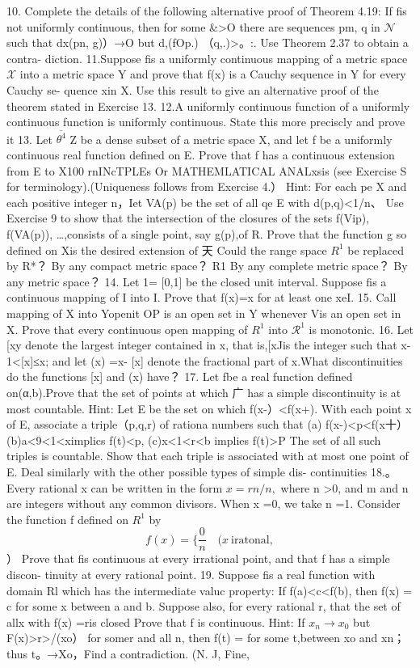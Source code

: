 10. Complete the details of the following alternative proof of Theorem 4.19: If fis not uniformly continuous, then for some &>O there are sequences {pm}, {q} in ${\mathcal{N}}$ such that dx(pn, g)）→O but d,(fOp.) （q,.)>。:. Use Theorem 2.37 to obtain a contra- diction. 11.Suppose fis a uniformly continuous mapping of a metric space ${\mathcal{X}}$ into a metric space Y and prove that {f(x)} is a Cauchy sequence in Y for every Cauchy se- quence {x}in X. Use this result to give an alternative proof of the theorem stated in Exercise 13. 12.A uniformly continuous function of a uniformly continuous function is uniformly continuous. State this more preciscly and prove it 13. Let $\overline{{\theta^{4}}}$ Z be a dense subset of a metric space X, and let f be a uniformly continuous real function defined on E. Prove that f has a continuous extension from E to X100 rnINcTPLEs Or MATHEMLATICAL ANALxsis (see Exercise S for terminology).(Uniqueness follows from Exercise 4.） Hint: For each pe X and each positive integer n，Iet VA(p) be the set of all qe E with d(p,q)<1/n、 Use Exercise 9 to show that the intersection of the closures of the sets f(Vip), f(VA(p)), …,consists of a single point, say g(p),of R. Prove that the function g so defined on Xis the desired extension of 天 Could the range space $\textstyle R^{1}$ be replaced by R*？ By any compact metric space？ R1 By any complete metric space？ By any metric space？ 14. Let 1= [0,1] be the closed unit interval. Suppose fis a continuous mapping of I into I. Prove that f(x)=x for at least one xeI. 15. Call mapping of X into Yopenit OP is an open set in Y whenever Vis an open set in X. Prove that every continuous open mapping of $\textstyle R^{1}$ into $\textstyle{\mathcal{R}}^{1}$ is monotonic. 16. Let [xy denote the largest integer contained in x, that is,[xJis the integer such that x-1<[x]≤x; and let (x) =x- [x] denote the fractional part of x.What discontinuities do the functions [x] and (x) have？ 17. Let fbe a real function defined on(α,b).Prove that the set of points at which 广 has a simple discontinuity is at most countable. Hint: Let E be the set on which f(x-）<f(x+). With each point x of E, associate a triple（p,q,r) of rationa numbers such that (a) f(x-)<p<f(x十） (b)a<9<1<ximplics f(t)<p, (c)x<1<r<b implies f(t)>P The set of all such triples is countable. Show that each triple is associated with at most one point of E. Deal similarly with the other possible types of simple dis- continuities 18.。Every rational x can be written in the form $x=r n/n,$ where n >0, and m and n are integers without any common divisors. When x =0, we take n =1. Consider the function f defined on $\textstyle R^{1}$ by $$ f(x)={\Bigg\{}{\frac{0}{n}}\quad(x\ {\mathrm{iratonal}}, $$ ） Prove that fis continuous at every irrational point, and that f has a simple discon- tinuity at every rational point. 19. Suppose fis a real function with domain Rl which has the intermediate valuc property: If f(a)<c<f(b), then f(x) = c for some x between a and b. Suppose also, for every rational r, that the set of allx with f(x) =ris closed Prove that f is continuous. Hint: If $x_{n}\to x_{0}$ but F(x)>r>/(xo） for somer and all n, then f(t) = for some t,between xo and xn；thus t。→Xo，Find a contradiction. (N. J, Fine, 